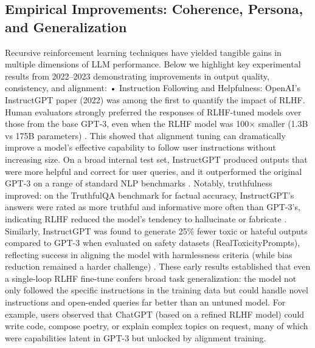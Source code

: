 \documentclass{article}
\begin{document}
\subsection{Empirical Improvements: Coherence, Persona, and Generalization}

Recursive reinforcement learning techniques have yielded tangible gains in multiple dimensions of LLM performance. Below we highlight key experimental results from 2022–2023 demonstrating improvements in output quality, consistency, and alignment:
	•	Instruction Following and Helpfulness: OpenAI’s InstructGPT paper (2022) was among the first to quantify the impact of RLHF. Human evaluators strongly preferred the responses of RLHF-tuned models over those from the base GPT-3, even when the RLHF model was 100× smaller (1.3B vs 175B parameters)  . This showed that alignment tuning can dramatically improve a model’s effective capability to follow user instructions without increasing size. On a broad internal test set, InstructGPT produced outputs that were more helpful and correct for user queries, and it outperformed the original GPT-3 on a range of standard NLP benchmarks  . Notably, truthfulness improved: on the TruthfulQA benchmark for factual accuracy, InstructGPT’s answers were rated as more truthful and informative more often than GPT-3’s, indicating RLHF reduced the model’s tendency to hallucinate or fabricate . Similarly, InstructGPT was found to generate 25\% fewer toxic or hateful outputs compared to GPT-3 when evaluated on safety datasets (RealToxicityPrompts), reflecting success in aligning the model with harmlessness criteria (while bias reduction remained a harder challenge) . These early results established that even a single-loop RLHF fine-tune confers broad task generalization: the model not only followed the specific instructions in the training data but could handle novel instructions and open-ended queries far better than an untuned model. For example, users observed that ChatGPT (based on a refined RLHF model) could write code, compose poetry, or explain complex topics on request, many of which were capabilities latent in GPT-3 but unlocked by alignment training.
\end{document}
